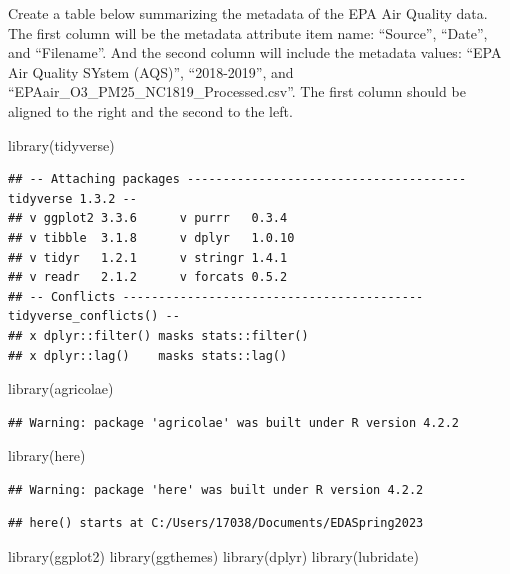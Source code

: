 \documentclass[
]{article}
\newenvironment{Shaded}{\begin{snugshade}}{\end{snugshade}}
\newcommand{\FunctionTok}[1]{\textcolor[rgb]{0.00,0.00,0.00}{#1}}
\newcommand{\NormalTok}[1]{#1}
\begin{document}
Create a table below summarizing the metadata of the EPA Air Quality
data. The first column will be the metadata attribute item name:
``Source'', ``Date'', and ``Filename''. And the second column will
include the metadata values: ``EPA Air Quality SYstem (AQS)'',
``2018-2019'', and ``EPAair\_O3\_PM25\_NC1819\_Processed.csv''. The
first column should be aligned to the right and the second to the left.

\begin{Shaded}
\begin{Highlighting}[]
\FunctionTok{library}\NormalTok{(tidyverse)}
\end{Highlighting}
\end{Shaded}

\begin{verbatim}
## -- Attaching packages --------------------------------------- tidyverse 1.3.2 --
## v ggplot2 3.3.6      v purrr   0.3.4 
## v tibble  3.1.8      v dplyr   1.0.10
## v tidyr   1.2.1      v stringr 1.4.1 
## v readr   2.1.2      v forcats 0.5.2 
## -- Conflicts ------------------------------------------ tidyverse_conflicts() --
## x dplyr::filter() masks stats::filter()
## x dplyr::lag()    masks stats::lag()
\end{verbatim}

\begin{Shaded}
\begin{Highlighting}[]
\FunctionTok{library}\NormalTok{(agricolae)}
\end{Highlighting}
\end{Shaded}

\begin{verbatim}
## Warning: package 'agricolae' was built under R version 4.2.2
\end{verbatim}

\begin{Shaded}
\begin{Highlighting}[]
\FunctionTok{library}\NormalTok{(here)}
\end{Highlighting}
\end{Shaded}

\begin{verbatim}
## Warning: package 'here' was built under R version 4.2.2
\end{verbatim}

\begin{verbatim}
## here() starts at C:/Users/17038/Documents/EDASpring2023
\end{verbatim}

\begin{Shaded}
\begin{Highlighting}[]
\FunctionTok{library}\NormalTok{(ggplot2)}
\FunctionTok{library}\NormalTok{(ggthemes)}
\FunctionTok{library}\NormalTok{(dplyr)}
\FunctionTok{library}\NormalTok{(lubridate)}
\end{Highlighting}
\end{Shaded}
\end{document}
